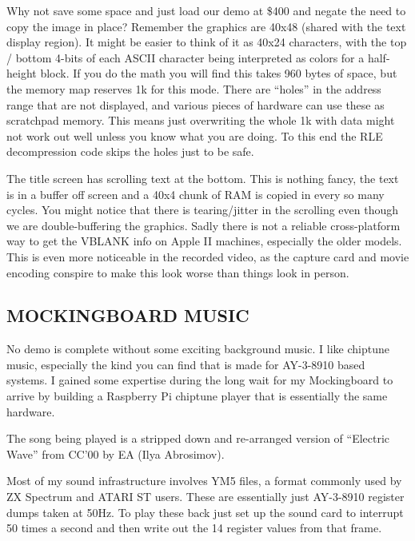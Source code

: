 \documentclass[twocolumn]{article}
\begin{document}
Why not save some space and just load our demo at \$400 and negate the need
to copy the image in place?
Remember the graphics are 40x48 (shared with the text display region).
It might be easier to think of it as 40x24 characters, with the top / bottom
4-bits of each ASCII character being interpreted as colors for a half-height
block.
If you do the math you will find this takes 960 bytes of space, but the memory
map reserves 1k for this mode.
There are ``holes'' in the address range that are not displayed, and 
various pieces of hardware can use these as scratchpad memory.  
This means just overwriting the whole 1k with data might not work out well
unless you know what you are doing.
To this end the RLE decompression code skips the holes just to be safe.

The title screen has scrolling text at the bottom.
This is nothing fancy, the text is in a buffer off screen and a 40x4 
chunk of RAM is copied in every so many cycles.
You might notice that there is tearing/jitter in the scrolling even
though we are double-buffering the graphics.  
Sadly there is not a reliable cross-platform way to get the VBLANK info 
on Apple II machines, especially the older models.
This is even more noticeable in the recorded video, as the capture card and
movie encoding conspire to make this look worse than things look in person.

\subsection{MOCKINGBOARD MUSIC}

No demo is complete without some exciting background music.
I like chiptune music, especially the kind you can find that is made
for AY-3-8910 based systems.
I gained some expertise during the long wait for my Mockingboard to arrive
by building a Raspberry Pi chiptune player that is essentially the same
hardware.

The song being played is a stripped down and re-arranged version of
``Electric Wave'' from CC'00 by EA (Ilya Abrosimov). 

Most of my sound infrastructure involves YM5 files, a format commonly
used  by ZX Spectrum and ATARI ST users.
These are essentially just AY-3-8910 register dumps taken at 50Hz.  
To play these back just set up the sound card to interrupt 50 times a second
and then write out the 14 register values from that frame.

\end{document}
